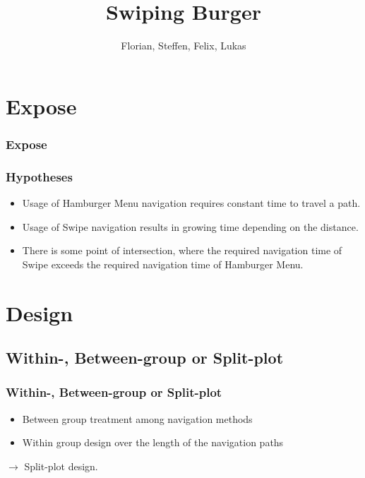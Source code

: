 \documentclass{beamer}
\begin{document}

\title{Swiping Burger}
\author{Florian, Steffen, Felix, Lukas}

\frame{\maketitle}

\section{Expose}
\begin{frame}
        \frametitle{Expose}

\end{frame}

\begin{frame}
        \frametitle{Hypotheses}
        \begin{itemize}
                \item Usage of Hamburger Menu navigation requires constant time to travel a path.
                \item Usage of Swipe navigation
                        results in growing time depending on the distance.
                \item There is some point of intersection,
                        where the required navigation time of Swipe exceeds the required navigation time of Hamburger Menu.
        \end{itemize}

\end{frame}


\section{Design}
\subsection{Within-, Between-group or Split-plot}
\begin{frame}
        \frametitle{Within-, Between-group or Split-plot}
        \begin{itemize}
                \item Between group treatment among navigation methods
                \item Within group design over the length of the navigation paths
        \end{itemize}
        $\rightarrow$ Split-plot design.
\end{frame}
\end{document}
